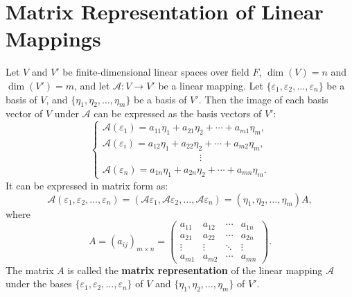 \documentclass[11pt]{../../TexTemplate/elegantbook} %
\begin{document}
\section{Matrix Representation of Linear Mappings}
Let \( V \) and \( V' \) be finite-dimensional linear spaces over field \( F \), 
\(\operatorname{dim}(V) = n\) and \(\operatorname{dim}(V') = m\),
and let \( \mathcal{A}: V \to V' \) be a linear mapping.
Let \( \{\varepsilon_1, \varepsilon_2, \dots, \varepsilon_n\} \) be a basis of \( V \),
and \( \{\eta_1, \eta_2, \dots, \eta_m\} \) be a basis of \( V' \).
Then the image of each basis vector of \( V \) under \( \mathcal{A} \) can be expressed as the basis vectors of \( V' \):
\[
\begin{cases} 
    \mathcal{A}(\varepsilon_1) = a_{11}\eta_{1}+a_{21}\eta_{2}+\cdots+a_{m1}\eta_{m},   \\ 
    \mathcal{A}(\varepsilon_i) = a_{12}\eta_{1}+a_{22}\eta_{2}+\cdots+a_{m2}\eta_{m},   \\
    \quad\quad\quad\quad\quad\quad\quad\quad\quad\quad\vdots \\
    \mathcal{A}(\varepsilon_n) = a_{1n}\eta_{1}+a_{2n}\eta_{2}+\cdots+a_{mn}\eta_{m}.
\end{cases}
\]
It can be expressed in matrix form as:
\[
\mathcal{A}(\varepsilon_1, \varepsilon_2, \dots, \varepsilon_n) = 
(\mathcal{A}\varepsilon_1, \mathcal{A}\varepsilon_2, \dots, \mathcal{A}\varepsilon_n) =
(\eta_1, \eta_2, \dots, \eta_m)A,
\]
where
\[A = (a_{ij})_{m \times n} =
\begin{pmatrix}
    a_{11} & a_{12} & \cdots & a_{1n} \\
    a_{21} & a_{22} & \cdots & a_{2n} \\
    \vdots & \vdots & \ddots & \vdots \\
    a_{m1} & a_{m2} & \cdots & a_{mn}
\end{pmatrix}.
\]
The matrix \( A \) is called the \textbf{matrix representation} of the linear mapping \( \mathcal{A} \)
under the bases \( \{\varepsilon_1, \varepsilon_2, \dots, \varepsilon_n\} \) of \( V \) 
and \( \{\eta_1, \eta_2, \dots, \eta_m\} \) of \( V' \).

\vspace{0.7cm}
\end{document}
